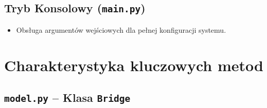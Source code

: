 \documentclass[12pt,a4paper]{article}
\begin{document}
\subsection{Tryb Konsolowy (\texttt{main.py})}
\begin{itemize}
    \item Obsługa argumentów wejściowych dla pełnej konfiguracji systemu.
\end{itemize}

\section{Charakterystyka kluczowych  metod}

 \subsection{\texttt{model.py} – Klasa \texttt{Bridge}}
\end{document}
